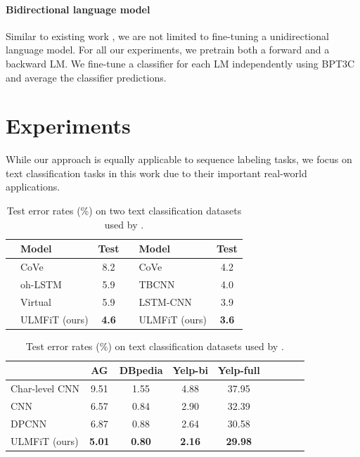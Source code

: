 \documentclass[11pt,a4paper]{article}
\begin{document}
\paragraph{Bidirectional language model} Similar to existing work \cite{peters2017semi,deepcontext2017}, we are not limited to fine-tuning a unidirectional language model. For all our experiments, we pretrain both a forward and a backward LM. We fine-tune a classifier for each LM independently using BPT3C and average the classifier predictions.

\section{Experiments} \label{sec:experiments}

While our approach is equally applicable to sequence labeling tasks, we focus on text classification tasks in this work due to their important real-world applications.

\begin{table}
  \centering
  \setlength\tabcolsep{3.65pt}
\begin{tabular}{llcllc}
    \toprule
 & Model & Test &  & Model & Test\\
\midrule
 \parbox[t]{2mm}{} & CoVe \cite{Mccann2017} & 8.2 & \parbox[t]{2mm}{} & CoVe \cite{Mccann2017} & 4.2 \\
 & oh-LSTM~\cite{johnson2016supervised} & 5.9 & & TBCNN~\cite{mou2015discriminative}& 4.0 \\
 & Virtual~\cite{miyato2016adversarial} & 5.9 & & LSTM-CNN~\cite{zhou2016text} & 3.9 \\
 & ULMFiT (ours) & \textbf{4.6} & & ULMFiT (ours) & \textbf{3.6} \\
\bottomrule
  \end{tabular}
      \caption{Test error rates (\%) on two text classification datasets used by .}
  \label{tab:results-mccann}
\end{table}

\begin{table}
\centering
\begin{tabular}{l c c c c c c c c}
\toprule
 & AG & DBpedia & Yelp-bi & Yelp-full \\
 \midrule
Char-level CNN \cite{zhang2015character} & 9.51 & 1.55 & 4.88 & 37.95 \\
CNN \cite{johnson2016supervised} & 6.57 & 0.84 & 2.90 & 32.39 \\
DPCNN \cite{johnson2017deep} & 6.87 & 0.88 & 2.64 & 30.58 \\
ULMFiT (ours) & \textbf{5.01} & \textbf{0.80} & \textbf{2.16} & \textbf{29.98} & \\
\bottomrule
\end{tabular}
\caption{Test error rates (\%) on text classification datasets used by .}
\label{tab:results-zhang}
\end{table}
\end{document}
